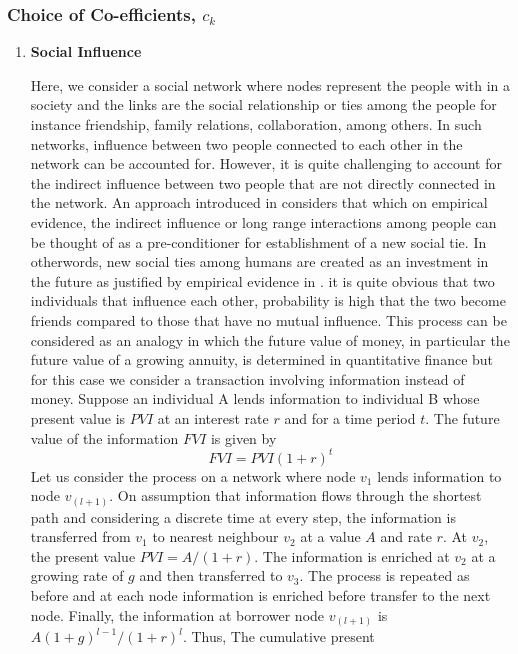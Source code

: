 \documentclass[10pt,a4paper]{article}
\begin{document}
        \subsubsection{Choice of Co-efficients, $c_k$}
        \begin{enumerate}[1)]
        	\item \textbf{Social Influence }
        	  	
    	    	Here, we consider a social network where nodes represent the people with in a society and the links are the social relationship or ties among the people for instance friendship, family relations, collaboration, among others. In such networks, influence between two people connected to each other in the network can be accounted for. However, it is quite challenging to account for the indirect influence between two people that are not directly connected in the network. An approach introduced in \citep{estrada2011epidemic}considers that which on empirical evidence, the indirect influence or long range interactions among people can be thought of as a pre-conditioner for establishment of a new social tie. In otherwords, new social ties among humans are created as an investment in the future as justified by empirical evidence in \citep{estrada2011epidemic}. it is quite obvious that two individuals that influence each other, probability is high that the two become friends compared to those that have no mutual influence. This process can be considered as an analogy in which the future value of money, in particular the future
    	    	value of a growing annuity, is determined in quantitative finance but for this case we consider a transaction involving information instead of money. Suppose an individual A lends information to individual B whose present value is $PVI$ at an interest rate $r$ and for a time period $t$. The future value of the information $FVI$ is given by
    	    	\begin{equation}
    	    	FVI = PVI (1+r)^t
    	    	\end{equation}
    	    	Let us consider the process on a network where node $v_1$ lends information to node $v_(l+1)$. On assumption that information flows through the shortest path and considering a discrete time at every step, the information is transferred from $v_1$ to nearest neighbour $v_2$ at a value $A$ and rate $r$. At $v_2$, the present value $PVI=A/(1+r)$. The information is enriched at $v_2$ at a growing rate of $g$ and then transferred to $v_3$. The process is repeated as before and at each node information is enriched before transfer to the next node. Finally, the information at borrower node $v_(l+1)$ is $A ( 1 + g )^ {l -1} /( 1 + r )^l$. Thus, The cumulative present

\end{enumerate}
\end{document}
